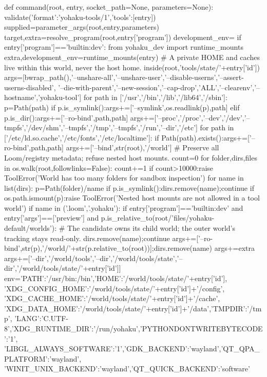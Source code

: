 def command(root, entry, socket_path=None, parameters=None):
    validate({'format':'yohaku-tools/1','tools':[entry]})
    supplied=parameter_args(root,entry,parameters)
    target,extra=resolve_program(root,entry['program'])
    development_env={}
    if entry['program']=='builtin:dev':
        from yohaku_dev import runtime_mounts
        extra,development_env=runtime_mounts(entry)
    # A private HOME and caches live within this world, never the host home.
    inside(root,'tools/state/'+entry['id'])
    args=[bwrap_path(),'--unshare-all','--unshare-user','--disable-userns','--assert-userns-disabled',
          '--die-with-parent','--new-session','--cap-drop','ALL','--clearenv','--hostname','yohaku-tool']
    for path in ['/usr','/bin','/lib','/lib64','/sbin']:
        p=Path(path)
        if p.is_symlink():args+=['--symlink',os.readlink(p),path]
        elif p.is_dir():args+=['--ro-bind',path,path]
    args+=['--proc','/proc','--dev','/dev','--tmpfs','/dev/shm','--tmpfs','/tmp','--tmpfs','/run','--dir','/etc']
    for path in ['/etc/ld.so.cache','/etc/fonts','/etc/localtime']:
        if Path(path).exists():args+=['--ro-bind',path,path]
    args+=['--bind',str(root),'/world']
    # Preserve all Loom/registry metadata; refuse nested host mounts.
    count=0
    for folder,dirs,files in os.walk(root,followlinks=False):
        count+=1
        if count>10000:raise ToolError('World has too many folders for sandbox inspection')
        for name in list(dirs):
            p=Path(folder)/name
            if p.is_symlink():dirs.remove(name);continue
            if os.path.ismount(p):raise ToolError('Nested host mounts are not allowed in a tool world')
            if name in ('.loom','.yohaku'):
                if entry['program']=='builtin:dev' and entry['args']==['preview'] and p.is_relative_to(root/'files/yohaku-default/worlds'):
                    # The candidate owns its child world; the outer world's tracking stays read-only.
                    dirs.remove(name);continue
                args+=['--ro-bind',str(p),'/world/'+str(p.relative_to(root))];dirs.remove(name)
    args+=extra
    args+=['--dir','/world/tools','--dir','/world/tools/state','--dir','/world/tools/state/'+entry['id']]
    env={'PATH':'/usr/bin:/bin','HOME':'/world/tools/state/'+entry['id'],
         'XDG_CONFIG_HOME':'/world/tools/state/'+entry['id']+'/config',
         'XDG_CACHE_HOME':'/world/tools/state/'+entry['id']+'/cache',
         'XDG_DATA_HOME':'/world/tools/state/'+entry['id']+'/data','TMPDIR':'/tmp',
         'LANG':'C.UTF-8','XDG_RUNTIME_DIR':'/run/yohaku','PYTHONDONTWRITEBYTECODE':'1',
         'LIBGL_ALWAYS_SOFTWARE':'1','GDK_BACKEND':'wayland','QT_QPA_PLATFORM':'wayland',
         'WINIT_UNIX_BACKEND':'wayland','QT_QUICK_BACKEND':'software'}
